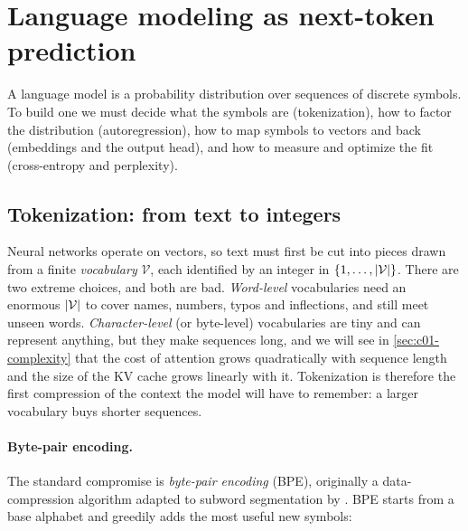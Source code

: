 \section{Language modeling as next-token prediction}\label{sec:c01-lm}

A language model is a probability distribution over sequences of discrete symbols. To build
one we must decide what the symbols are (tokenization), how to factor the distribution
(autoregression), how to map symbols to vectors and back (embeddings and the output head),
and how to measure and optimize the fit (cross-entropy and perplexity).

\subsection{Tokenization: from text to integers}\label{sec:c01-tokenization}

Neural networks operate on vectors, so text must first be cut into pieces drawn from a
finite \emph{vocabulary} $\mathcal{V}$, each identified by an integer in
$\{1,\dots,\left\lvert \mathcal{V}\right\rvert\}$. There are two extreme choices, and both are bad.
\emph{Word-level} vocabularies need an enormous $\left\lvert \mathcal{V}\right\rvert$ to cover names,
numbers, typos and inflections, and still meet unseen words. \emph{Character-level} (or
byte-level) vocabularies are tiny and can represent anything, but they make sequences long,
and we will see in \cref{sec:c01-complexity} that the cost of attention grows quadratically
with sequence length and the size of the KV cache grows linearly with it. Tokenization is
therefore the first compression of the context the model will have to remember: a larger
vocabulary buys shorter sequences.

\paragraph{Byte-pair encoding.} The standard compromise is \emph{byte-pair encoding} (BPE),
originally a data-compression algorithm \citep{c01-gage1994bpe} adapted to subword
segmentation by \citet{c01-sennrich2016bpe}. BPE starts from a base alphabet and greedily
adds the most useful new symbols:

